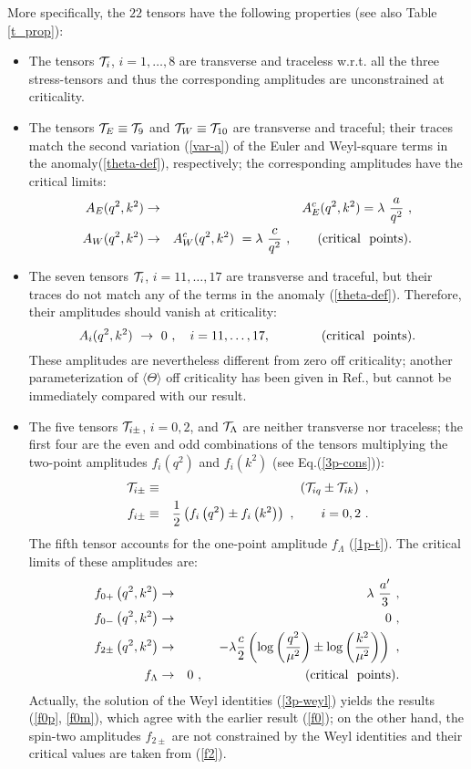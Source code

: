 \documentclass[11pt]{article}
\newcommand{\beq}{\begin{equation}}
\newcommand{\eeq}{\end{equation}}
\newcommand{\bea}{\begin{eqnarray}}
\newcommand{\eea}{\end{eqnarray}}
\def\l{\lambda}
\def\nl{\nonumber\\}
\def\bra{\langle}
\def\ket{\rangle}
\begin{document}
More specifically, the $22$ tensors have
the following properties (see also Table \ref{t_prop}):
\begin{itemize}
\item
The tensors ${\cal T}_i$, $i=1,\dots,8$ are transverse and traceless
w.r.t. all the three stress-tensors and thus the corresponding
amplitudes are unconstrained at criticality.
\item
The tensors ${\cal T}_E\equiv {\cal T}_9$ and 
${\cal T}_W\equiv {\cal T}_{10}$ are transverse and traceful;
their traces match the second variation (\ref{var-a}) of the 
Euler and Weyl-square terms in the anomaly(\ref{theta-def}), respectively; 
the corresponding amplitudes have the critical limits:
\bea
A_E(q^2,k^2)& \to& A^c_E(q^2,k^2) = \l\ \frac{a}{q^2}\ , \nl 
A_W(q^2,k^2)& \to& A^c_W(q^2,k^2)\ =\l\ \frac{c}{q^2} \ ,\qquad
{\rm (critical\ \ points)}.
\label{EW-lim}
\eea
\item
The seven tensors ${\cal T}_i$, $i=11,\dots,17$ are transverse and
traceful, but their traces do not match any of the terms in the anomaly
(\ref{theta-def}). Therefore, their amplitudes should vanish at criticality:
\beq
A_i(q^2,k^2)\ \to\ 0\ , \quad i=11,\dots,17, \qquad
\qquad {\rm (critical\ \ points)}.
\label{ai-lim}
\eeq 
These amplitudes are nevertheless different from zero off criticality;
another parameterization of $\bra \Theta \ket$ off criticality has been given 
in Ref.\cite{jo}, but cannot be immediately compared with our result.
\item
The five tensors ${\cal T}_{i\pm}$, $i=0,2$, and ${\cal T}_\Lambda$
are neither transverse nor traceless; the first four are the even and
odd combinations of the tensors multiplying the two-point
amplitudes $f_i\left(q^2\right)$ and $f_i\left(k^2\right)$ 
(see Eq.(\ref{3p-cons})):
\bea
{\cal T}_{i\pm}&\equiv &
\left( {\cal T}_{iq} \pm {\cal T}_{ik} \right)\ ,\label{pm-tens}\\
f_{i\pm} &\equiv & \frac{1}{2}
\left( f_i\left(q^2\right) \pm f_i\left(k^2\right) \right)\ ,
\qquad i=0,2\ .
\label{pm-amp}
\eea
The fifth tensor accounts for the one-point amplitude $f_\Lambda$
(\ref{1p-t}). The critical limits of these amplitudes are:
\bea
f_{0+}\left(q^2,k^2 \right) & \to & \l\ \frac{a'}{3}\ , 
\label{f0p}\\
f_{0-}\left(q^2,k^2 \right) & \to & 0 \ , 
\label{f0m}\\
f_{2\pm}\left(q^2,k^2 \right) & \to & - \l \frac{c}{2}
\left(  \log\left(q^2\over \mu^2 \right) \pm
        \log\left(k^2\over \mu^2 \right)
       \right)\ , \label{f2pm} \\
f_\Lambda & \to & 0\ ,\qquad\qquad\qquad\qquad {\rm (critical\ \ points).} 
\label{flac}
\eea
Actually, the solution of the Weyl identities (\ref{3p-weyl}) 
yields the results (\ref{f0p}, \ref{f0m}), which agree with the
earlier result (\ref{f0});
on the other hand, the spin-two amplitudes $f_{2\pm}$ are not
constrained by the Weyl identities and their critical values are
taken from (\ref{f2}).
\end{itemize}
\end{document}
